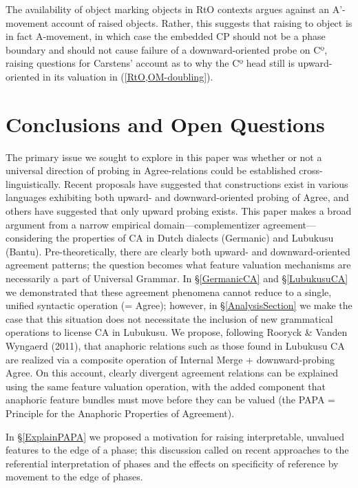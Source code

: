\documentclass[output=paper
,modfonts
,nonflat
]{langsci/langscibook}
\begin{document}
The availability of object marking objects in RtO contexts argues against an A’-movement account of raised objects. Rather, this suggests that raising to object is in fact A-movement, in which case the embedded CP should not be a phase boundary and should not cause failure of a downward-oriented probe on Cº, raising questions for Carstens’ account as to why the Cº head still is upward-oriented in its valuation in (\ref{RtO,OM-doubling}).

\section{Conclusions and Open Questions}

The primary issue we sought to explore in this paper was whether or not a universal direction of probing in Agree-relations could be established cross-linguistically. Recent proposals have suggested that constructions exist in various languages exhibiting both upward- and downward-oriented probing of Agree, and others have suggested that only upward probing exists. This paper makes a broad argument from a narrow empirical domain—complementizer agreement—considering the properties of CA in Dutch dialects (Germanic) and Lubukusu (Bantu). Pre-theoretically, there are clearly both upward- and downward-oriented agreement patterns; the question becomes what feature valuation mechanisms are necessarily a part of Universal Grammar. In \S \ref{GermanicCA} and \S \ref{LubukusuCA} we demonstrated that these agreement phenomena cannot reduce to a single, unified syntactic operation (= Agree); however, in \S \ref{AnalysisSection} we make the case that this situation does not necessitate the inclusion of new grammatical operations to license CA in Lubukusu. We propose, following Rooryck \& Vanden Wyngaerd (2011), that anaphoric relations such as those found in Lubukusu CA are realized via a composite operation of Internal Merge + downward-probing Agree. On this account, clearly divergent agreement relations can be explained using the same feature valuation operation, with the added component that anaphoric feature bundles must move before they can be valued (the PAPA = Principle for the Anaphoric Properties of Agreement). 

In \S \ref{ExplainPAPA} we proposed a motivation for raising interpretable, unvalued features to the edge of a phase; this discussion called on recent approaches to the referential interpretation of phases and the effects on specificity of reference by movement to the edge of phases. 
        
\end{document}
